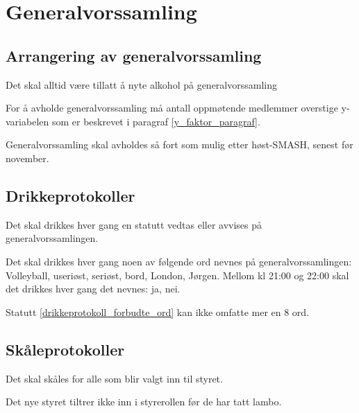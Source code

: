   
\section{Generalvorssamling}
    \subsection{Arrangering av generalvorssamling}
        \begin{statute}
            Det skal alltid være tillatt å nyte alkohol på generalvorssamling
        \end{statute}
        \begin{statute} 
            For å avholde generalvorssamling må antall oppmøtende medlemmer overstige y-variabelen som er beskrevet i paragraf \ref{y_faktor_paragraf}.
        \end{statute}
        \begin{statute}
            Generalvorssamling skal avholdes så fort som mulig etter høst-SMASH, senest før november.
        \end{statute}
        
    \subsection{Drikkeprotokoller}
        \begin{statute}
            Det skal drikkes hver gang en statutt vedtas eller avvises på generalvorssamlingen.
        \end{statute}
        \begin{statute}[\label{drikkeprotokoll_forbudte_ord}]
            Det skal drikkes hver gang noen av følgende ord nevnes på generalvorssamlingen: Volleyball, useriøst, seriøst, bord, London, Jørgen. Mellom kl 21:00 og 22:00 skal det drikkes hver gang det nevnes: ja, nei.
        \end{statute}
        \begin{statute}
            Statutt \ref{drikkeprotokoll_forbudte_ord} kan ikke omfatte mer en 8 ord.
        \end{statute}
        
    \subsection{Skåleprotokoller}
        \begin{statute}
            Det skal skåles for alle som blir valgt inn til styret.
        \end{statute}
        \begin{statute}
            Det nye styret tiltrer ikke inn i styrerollen før de har tatt lambo.
        \end{statute}            
